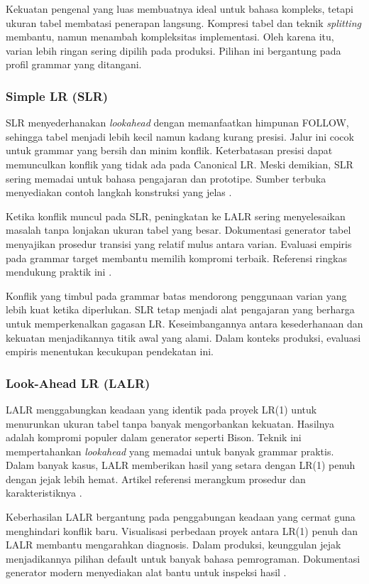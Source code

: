 \documentclass[../main.tex]{subfiles}
\begin{document}
Kekuatan pengenal yang luas membuatnya ideal untuk bahasa kompleks, tetapi ukuran tabel membatasi penerapan langsung. Kompresi tabel dan teknik \emph{splitting} membantu, namun menambah kompleksitas implementasi. Oleh karena itu, varian lebih ringan sering dipilih pada produksi. Pilihan ini bergantung pada profil grammar yang ditangani.

\subsubsection{Simple LR (SLR)}
SLR menyederhanakan \emph{lookahead} dengan memanfaatkan himpunan FOLLOW, sehingga tabel menjadi lebih kecil namun kadang kurang presisi. Jalur ini cocok untuk grammar yang bersih dan minim konflik. Keterbatasan presisi dapat memunculkan konflik yang tidak ada pada Canonical LR. Meski demikian, SLR sering memadai untuk bahasa pengajaran dan prototipe. Sumber terbuka menyediakan contoh langkah konstruksi yang jelas \citep{WikiSLR}.

Ketika konflik muncul pada SLR, peningkatan ke LALR sering menyelesaikan masalah tanpa lonjakan ukuran tabel yang besar. Dokumentasi generator tabel menyajikan prosedur transisi yang relatif mulus antara varian. Evaluasi empiris pada grammar target membantu memilih kompromi terbaik. Referensi ringkas mendukung praktik ini \citep{WikiSLR}.

Konflik yang timbul pada grammar batas mendorong penggunaan varian yang lebih kuat ketika diperlukan. SLR tetap menjadi alat pengajaran yang berharga untuk memperkenalkan gagasan LR. Keseimbangannya antara kesederhanaan dan kekuatan menjadikannya titik awal yang alami. Dalam konteks produksi, evaluasi empiris menentukan kecukupan pendekatan ini.

\subsubsection{Look-Ahead LR (LALR)}
LALR menggabungkan keadaan yang identik pada proyek LR(1) untuk menurunkan ukuran tabel tanpa banyak mengorbankan kekuatan. Hasilnya adalah kompromi populer dalam generator seperti Bison. Teknik ini mempertahankan \emph{lookahead} yang memadai untuk banyak grammar praktis. Dalam banyak kasus, LALR memberikan hasil yang setara dengan LR(1) penuh dengan jejak lebih hemat. Artikel referensi merangkum prosedur dan karakteristiknya \citep{WikiLALR}.

Keberhasilan LALR bergantung pada penggabungan keadaan yang cermat guna menghindari konflik baru. Visualisasi perbedaan proyek antara LR(1) penuh dan LALR membantu mengarahkan diagnosis. Dalam produksi, keunggulan jejak menjadikannya pilihan default untuk banyak bahasa pemrograman. Dokumentasi generator modern menyediakan alat bantu untuk inspeksi hasil \citep{BisonManual}.
\end{document}
